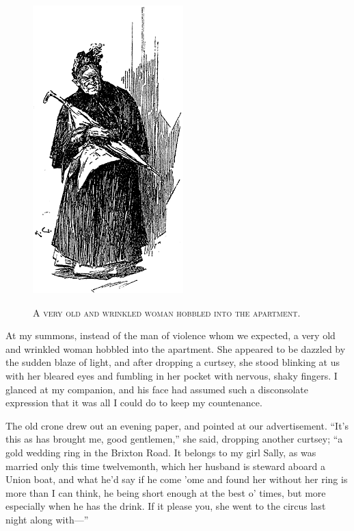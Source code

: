 \documentclass[12pt,english,oneside]{book}
\newcommand{\noun}[1]{\textsc{#1}}
\newcommand{\mdsh}[1]{\mbox{#1}\linebreak[1]}
\begin{document}
%
\begin{figure}[htbp]
\noindent \begin{center}\includegraphics{images/study10-stud-09.png}\end{center}

\noindent \begin{center}\noun{A very old and wrinkled woman hobbled
into the apartment.}\end{center}
\end{figure}
At my summons, instead of the man of violence whom we expected, a
very old and wrinkled woman hobbled into the apartment. She appeared
to be dazzled by the sudden blaze of light, and after dropping a curtsey,
she stood blinking at us with her bleared eyes and fumbling in her
pocket with nervous, shaky fingers. I glanced at my companion, and
his face had assumed such a disconsolate expression that it was all
I could do to keep my countenance.

The old crone drew out an evening paper, and pointed at our advertisement.
{}``It's this as has brought me, good gentlemen,'' she said, dropping
another curtsey; {}``a gold wedding ring in the Brixton Road. It
belongs to my girl Sally, as was married only this time twelvemonth,
which her husband is steward aboard a Union boat, and what he'd say
if he come 'ome and found her without her ring is more than I can
think, he being short enough at the best o' times, but more especially
when he has the drink. If it please you, she went to the circus last
night along with\mdsh{---}''
\end{document}
